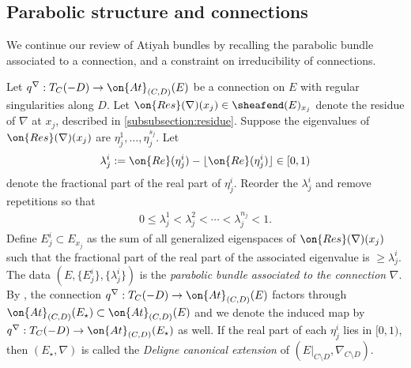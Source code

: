 \subsection{Parabolic structure and connections}
\label{subsection:atiyah-properties}
We continue  our review of Atiyah bundles by recalling the parabolic bundle
associated to a connection, and a constraint on irreducibility of connections.

\begin{definition}
\notready
	\label{definition:associated-parabolic}
	Let $q^\nabla: T_C(-D) \to \on{At}_{(C,D)}(E)$ be a connection on $E$
	with regular singularities along $D$.
	Let $\on{Res}(\nabla)(x_j) \in \sheafend(E)_{x_j}$ denote the residue
	of $\nabla$ at $x_j$, described in \autoref{subsubsection:residue}.
	Suppose the eigenvalues of $\on{Res}(\nabla)(x_j)$ are $\eta_j^1, \ldots,
	\eta^{s_j}_j$. Let $$\lambda^i_j:=\on{Re}(\eta^i_j)-\lfloor \on{Re}(\eta^i_j)\rfloor \in[0,1)$$ denote the fractional part of the real
	part of $\eta^i_j$. Reorder the $\lambda^i_j$ and remove repetitions so that
	\begin{align*}
		0 \leq \lambda^1_j < \lambda^2_j < \cdots < \lambda_j^{n_j} < 1.
	\end{align*}
	Define $E^i_j \subset E_{x_j}$ as the sum of all generalized eigenspaces
	of $\on{Res}(\nabla)(x_j)$
	such that the fractional part of the real part of the associated
	eigenvalue is $\geq \lambda^i_j$.
	The data $(E, \{E^i_j\}, \{\lambda^i_j\})$ is the {\em parabolic bundle
	associated to the connection} $\nabla$.
	By \cite[Lemma 4.1]{BHH:parabolic}, the connection $q^\nabla: T_C(-D) \to
	\on{At}_{(C, D)}(E)$
	factors through $\on{At}_{(C, D)}(E_\star) \subset \on{At}_{(C, D)}(E)$
	and we denote the induced map by $q^\nabla : T_C(-D) \to \on{At}_{(C,
	D)}(E_\star)$ as well.
	If the real part of each $\eta^i_j$ lies in $[0,1)$, then $(E_\star,
	\nabla)$ is
	called the {\em Deligne canonical extension} of $(E|_{C \setminus D},
	\nabla_{C \setminus D})$.
\end{definition}

